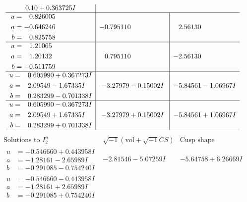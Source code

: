 \documentclass[1p]{elsarticle_modified}
\theoremstyle{definition}
\newcommand{\I}{\sqrt{-1}}
\begin{document}
$$\begin{array}{c|c|c}
0. 10   + 0.363725 I \\ \hline\begin{aligned}
u &= \phantom{-}0.826005\phantom{ +0.000000I} \\
a &= -0.646246\phantom{ +0.000000I} \\
b &= \phantom{-}0.825758\phantom{ +0.000000I}\end{aligned}
 & -0.795110\phantom{ +0.000000I} & \phantom{-}2.56130\phantom{ +0.000000I} \\ \hline\begin{aligned}
u &= \phantom{-}1.21065\phantom{ +0.000000I} \\
a &= \phantom{-}1.20132\phantom{ +0.000000I} \\
b &= -0.511759\phantom{ +0.000000I}\end{aligned}
 & \phantom{-}0.795110\phantom{ +0.000000I} & -2.56130\phantom{ +0.000000I} \\ \hline\begin{aligned}
u &= \phantom{-}0.605990 + 0.367273 I \\
a &= \phantom{-}2.09549 - 1.67335 I \\
b &= \phantom{-}0.283299 - 0.701338 I\end{aligned}
 & -3.27979 - 0.15002 I & -5.84561 - 1.06967 I \\ \hline\begin{aligned}
u &= \phantom{-}0.605990 - 0.367273 I \\
a &= \phantom{-}2.09549 + 1.67335 I \\
b &= \phantom{-}0.283299 + 0.701338 I\end{aligned}
 & -3.27979 + 0.15002 I & -5.84561 + 1.06967 I\\
 \hline 
 \end{array}$$\newpage$$\begin{array}{c|c|c}  
\text{Solutions to }I^u_{2}& \I (\text{vol} + \sqrt{-1}CS) & \text{Cusp shape}\\
 \hline 
\begin{aligned}
u &= -0.546660 + 0.443958 I \\
a &= -1.28161 - 2.65989 I \\
b &= -0.291085 - 0.754240 I\end{aligned}
 & -2.81546 - 5.07259 I & -5.64758 + 6.26669 I \\ \hline\begin{aligned}
u &= -0.546660 - 0.443958 I \\
a &= -1.28161 + 2.65989 I \\
b &= -0.291085 + 0.754240 I\end{aligned}

\end{array}$$
\end{document}
